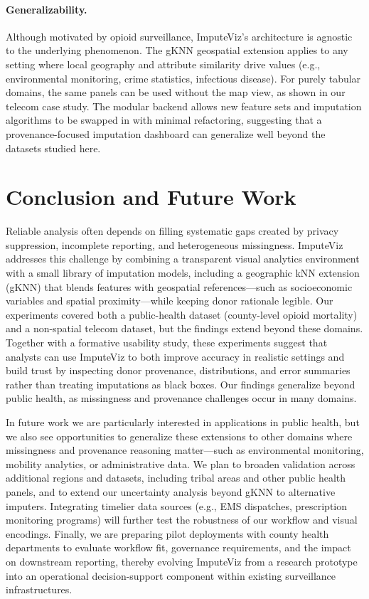 \documentclass[review]{vgtc}
\newcommand{\gknn}{gKNN\xspace}
\newcommand{\tool}{ImputeViz\xspace}
\begin{document}
\paragraph*{Generalizability.}
Although motivated by opioid surveillance, \tool's architecture is agnostic to the underlying phenomenon. The gKNN geospatial extension applies to any setting where local geography and attribute similarity drive values (e.g., environmental monitoring, crime statistics, infectious disease). For purely tabular domains, the same panels can be used without the map view, as shown in our telecom case study. The modular backend allows new feature sets and imputation algorithms to be swapped in with minimal refactoring, suggesting that a provenance-focused imputation dashboard can generalize well beyond the datasets studied here.

\vspace{-4pt}
\section{Conclusion and Future Work}
\label{sec:conclusion}

Reliable analysis often depends on filling systematic gaps created by privacy suppression, incomplete reporting, and heterogeneous missingness. \tool addresses this challenge by combining a transparent visual analytics environment with a small library of imputation models, including a geographic kNN extension (\gknn) that blends features with geospatial references---such as socioeconomic variables and spatial proximity---while keeping donor rationale legible. Our experiments covered both a public-health dataset (county-level opioid mortality) and a non-spatial telecom dataset, but the findings extend beyond these domains. Together with a formative usability study, these experiments suggest that analysts can use ImputeViz to both improve accuracy in realistic settings and build trust by inspecting donor provenance, distributions, and error summaries rather than treating imputations as black boxes. Our findings generalize beyond public health, as missingness and provenance challenges occur in many domains.

In future work we are particularly interested in applications in public health, but we also see opportunities to generalize these extensions to other domains where missingness and provenance reasoning matter---such as environmental monitoring, mobility analytics, or administrative data. We plan to broaden validation across additional regions and datasets, including tribal areas and other public health panels, and to extend our uncertainty analysis beyond gKNN to alternative imputers. Integrating timelier data sources (e.g., EMS dispatches, prescription monitoring programs) will further test the robustness of our workflow and visual encodings. Finally, we are preparing pilot deployments with county health departments to evaluate workflow fit, governance requirements, and the impact on downstream reporting, thereby evolving \tool from a research prototype into an operational decision-support component within existing surveillance infrastructures.
\end{document}
